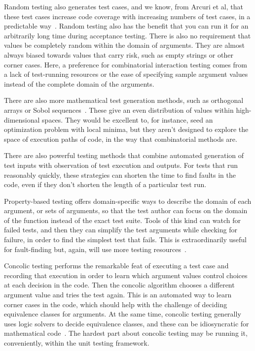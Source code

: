 \documentclass{juliacon}
\begin{document}
\vskip 6pt
Random testing also generates test cases, and we know, from Arcuri et al, that these test cases increase code coverage with increasing numbers of test cases, in a predictable way~\cite{Arcuri2012-az}. Random testing also has the benefit that you can run it for an arbitrarily long time during acceptance testing. There is also no requirement that values be completely random within the domain of arguments. They are almost always biased towards values that carry risk, such as empty strings or other corner cases. Here, a preference for combinatorial interaction testing comes from a lack of test-running resources or the ease of specifying sample argument values instead of the complete domain of the arguments.

\vskip 6pt
There are also more mathematical test generation methods, such as orthogonal arrays or Sobol sequences~\cite{He2013-th}. These give an even distribution of values within high-dimensional spaces. They would be excellent to, for instance, seed an optimization problem with local minima, but they aren't designed to explore the space of execution paths of code, in the way that combinatorial methods are.

\vskip 6pt
There are also powerful testing methods that combine automated generation of test inputs with observation of test execution and outputs. For tests that run reasonably quickly, these strategies can shorten the time to find faults in the code, even if they don't shorten the length of a particular test run.

\vskip 6pt
Property-based testing offers domain-specific ways to describe the domain of each argument, or sets of arguments, so that the test author can focus on the domain of the function instead of the exact test suite. Tools of this kind can watch for failed tests, and then they can simplify the test arguments while checking for failure, in order to find the simplest test that fails. This is extraordinarily useful for fault-finding but, again, will use more testing resources~\cite{loscher2018automating}.

\vskip 6pt
Concolic testing performs the remarkable feat of executing a test case and recording that execution in order to learn which argument values control choices at each decision in the code. Then the concolic algorithm chooses a different argument value and tries the test again. This is an automated way to learn corner cases in the code, which should help with the challenge of deciding equivalence classes for arguments. At the same time, concolic testing generally uses logic solvers to decide equivalence classes, and these can be idiosyncratic for mathematical code~\cite{King1976-jt,Wang2018-xh}. The hardest part about concolic testing may be running it, conveniently, within the unit testing framework.
\end{document}
